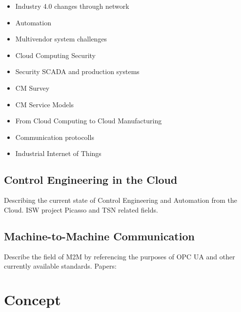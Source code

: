 \documentclass[
a4paper,
twoside,
headsepline,
cleardoublepage=empty,
parskip=half,
draft=false
]{scrbook}
\begin{document}
			\begin{itemize}
				
				\item Industry 4.0 changes through network~\cite{brettel2014virtualization}
				
				\item Automation~\cite{jazdi2014cyber}
				
				\item Multivendor system challenges~\cite{weyer2015towards}
				
				\item Cloud Computing Security~\cite{subashini2011survey}
				
				\item Security SCADA and production systems~\cite{igure2006security}
				
				\item CM Survey~\cite{he2015state}
				
				\item CM Service Models~\cite{li2010cloud}
				
				\item From Cloud Computing to Cloud Manufacturing~\cite{xu2012cloud}
				
				\item Communication protocolls~\cite{wollschlaeger2017future}
				
				\item Industrial Internet of Things~\cite{jeschke2017industrial}
				
			\end{itemize}
		
		\section{Control Engineering in the Cloud}\label{sec:control_engineering_in_the_cloud}
		
			Describing the current state of Control Engineering and Automation from the Cloud.
			ISW project Picasso and TSN related fields.
		
		\section{Machine-to-Machine Communication}\label{sec:machine_to_machine_communication}
		
			Describe the field of M2M by referencing the purposes of OPC UA and other currently available standards. Papers:
				
	\chapter{Concept} \label{ch:concept}
	
\end{document}
